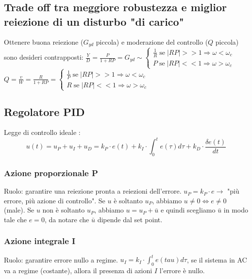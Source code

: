 \begin{landscape}
\begin{multicols*}{3}
    \subsection*{Trade off tra meggiore robustezza e miglior reiezione di un disturbo "di carico"}
    Ottenere buona reiezione ($G_{yd}$ piccola) e moderazione del controllo ($Q$ piccola) sono desideri contrapposti:\newline
    $\frac{Y}{D} = \frac{P}{1+RP} = G_{yd} \sim \begin{cases}
        \frac{1}{R} \; \text{se}\; |RP| >> 1 \Rightarrow \omega < \omega_c\\
        P \; \text{se}\; |RP|<< 1 \Rightarrow \omega > \omega_c
    \end{cases}$\newline
    $Q = \frac{v}{W} = \frac{R}{1+RP} = \begin{cases}
        \frac{1}{P} \; \text{se}\; |RP| >> 1 \Rightarrow  \omega< \omega_c\\
        R \; \text{se}\; |RP| << 1 \Rightarrow \omega > \omega_c
    \end{cases}$
    \subsection*{Regolatore PID}
    Legge di controllo ideale :
    \[
        u(t) = u_P + u_I + u_D = k_P \cdot e(t) + k_I \cdot \int_{0}^{t}e(\tau)d \tau + k_D \cdot \frac{\delta e (t)}{dt}
    \]
    \subsubsection*{Azione proporzionale P}
    Ruolo: garantire una reiezione pronta a reiezioni dell'errore. \newline
    \newline
    $u_P = k_P \cdot e \rightarrow $ "più errore, più azione di controllo".\newline
    Se $u$ è soltanto $u_P$, abbiamo $u \neq 0 \Leftrightarrow e \neq 0$ (male).\newline
    Se $u$ non è soltanto $u_P$, abbiamo $u = u_P + \bar{u}$ e quindi scegliamo $\bar{u}$ in modo tale che $e = 0$, da notare che $\bar{u}$ dipende dal set point.
    \subsubsection*{Azione integrale I}
    Ruolo: garantire errore nullo a regime. \newline
    \newline
    $u_I = k_I \cdot \int_{0}^{t} e (tau) d \tau$, se il sistema in AC va a regime (costante), allora il presenza di azioni $I$ l'errore è nullo.

\end{multicols*}
\end{landscape}
